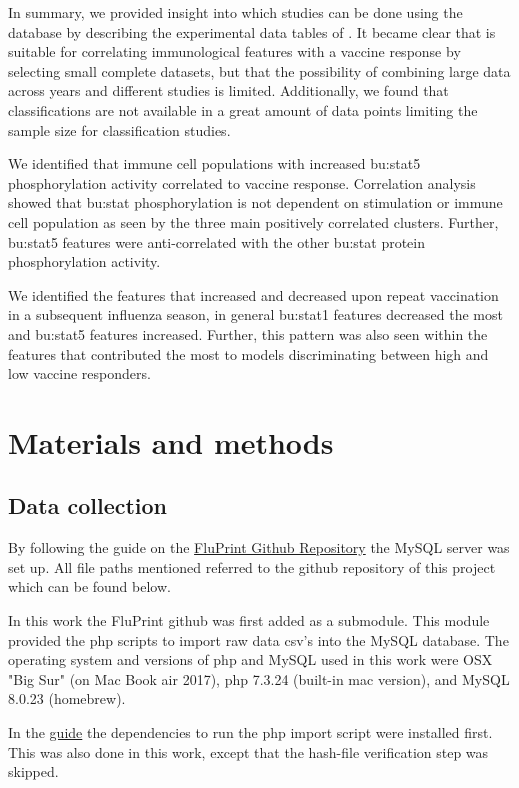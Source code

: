 In summary, we provided insight into which studies can be done using the \flup database by describing the experimental data tables of \flup.
It became clear that \flup is suitable for correlating immunological features with a vaccine response by selecting small complete datasets, but that the possibility of combining large data across years and different studies is limited.
Additionally, we found that classifications are not available in a great amount of data points limiting the sample size for classification studies.

We identified that immune cell populations with increased \gls{bu:stat}5 phosphorylation activity correlated to vaccine response.
Correlation analysis showed that \gls{bu:stat} phosphorylation is not dependent on stimulation or immune cell population as seen by the three main positively correlated clusters.
Further, \gls{bu:stat}5 features were anti-correlated with the other \gls{bu:stat} protein phosphorylation activity.

We identified the features that increased and decreased upon repeat vaccination in a subsequent influenza season, in general \gls{bu:stat}1 features decreased the most and \gls{bu:stat}5 features increased.
Further, this pattern was also seen within the features that contributed the most to models discriminating between high and low vaccine responders.


\section{Materials and methods}

\subsection{Data collection}

By following the guide on the \href{https://github.com/LogIN-/fluprint}{FluPrint Github Repository} the MySQL
server was set up.
All file paths mentioned referred to the github repository of this project which can be found below.

In this work the FluPrint github was first added as a submodule.
This module provided the php scripts to import raw data csv's into the MySQL database.
The operating system and versions of php and MySQL used in this work were OSX "Big Sur" (on Mac Book air 2017), php 7.3.24 (built-in mac version), and MySQL 8.0.23 (homebrew).

In the \href{https://github.com/LogIN-/fluprint}{guide} the dependencies to run
the php import script were installed first. This was also done in this work,
except that the hash-file verification step was skipped.

